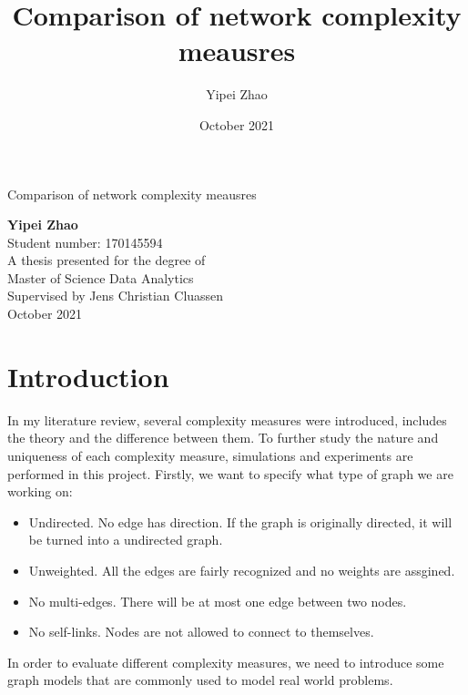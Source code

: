 \documentclass[12pt]{article}
\title{Comparison of network complexity meausres}
\author{Yipei Zhao}
\date{October 2021}
\begin{document}
\begin{titlepage}
    \begin{center}
        \vspace*{1cm}
 
        {\Huge Comparison of network complexity meausres}
 
        \vspace{0.5cm}
         
             
        \vspace{1.5cm}
 
        \textbf{Yipei Zhao}\\
        Student number: 170145594\\
        A thesis presented for the degree of\\
        Master of Science Data Analytics\\
        {\large Supervised by Jens Christian Cluassen}\\
        October 2021
 
        \vfill
             

    \end{center}
 \end{titlepage}

\tableofcontents
\pagebreak
\renewcommand{\familydefault}{}
\section{Introduction}
In my literature review\cite{litreview}, several complexity measures were introduced, includes the theory and the difference between them. To further study the nature and uniqueness of each complexity measure, simulations and experiments are performed in this project. Firstly, we want to specify what type of graph we are working on:
\begin{itemize}
    \item Undirected. No edge has direction. If the graph is originally directed, it will be turned into a undirected graph.
    \item Unweighted. All the edges are fairly recognized and no weights are assgined.
    \item No multi-edges. There will be at most one edge between two nodes.
    \item No self-links. Nodes are not allowed to connect to themselves. 
\end{itemize}
In order to evaluate different complexity measures, we need to introduce some graph models that are commonly used to model real world problems.
\end{document}
